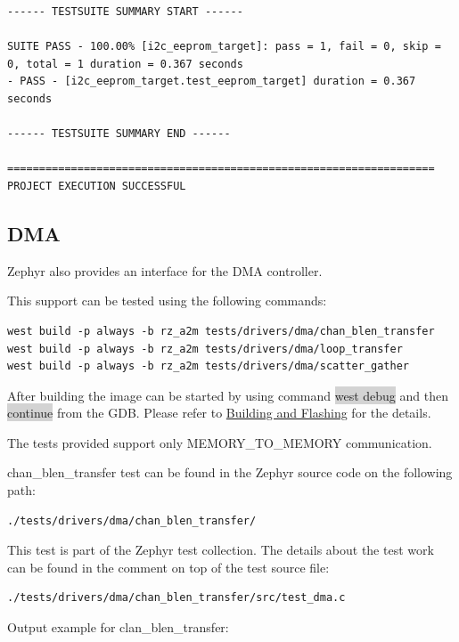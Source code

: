 \documentclass[11pt,a4paper,oneside]{article}
\begin{document}
\begin{lstlisting}
------ TESTSUITE SUMMARY START ------

SUITE PASS - 100.00% [i2c_eeprom_target]: pass = 1, fail = 0, skip = 0, total = 1 duration = 0.367 seconds
- PASS - [i2c_eeprom_target.test_eeprom_target] duration = 0.367 seconds

------ TESTSUITE SUMMARY END ------

===================================================================
PROJECT EXECUTION SUCCESSFUL
\end{lstlisting}

\subsection{DMA}\label{dma}

Zephyr also provides an interface for the DMA controller.

This support can be tested using the following commands:

\begin{lstlisting}
west build -p always -b rz_a2m tests/drivers/dma/chan_blen_transfer
west build -p always -b rz_a2m tests/drivers/dma/loop_transfer
west build -p always -b rz_a2m tests/drivers/dma/scatter_gather
\end{lstlisting}

After building the image can be started by using command \colorbox{lightgray}{west debug}
and then \colorbox{lightgray}{continue} from the GDB. Please refer to
\hyperref[building-and-flashing]{Building and Flashing} for the
details.

The tests provided support only MEMORY\_TO\_MEMORY communication.

chan\_blen\_transfer test can be found in the Zephyr source code on the
following path:

\begin{lstlisting}
./tests/drivers/dma/chan_blen_transfer/
\end{lstlisting}

This test is part of the Zephyr test collection. The details about the
test work can be found in the comment on top of the test source file:
\begin{lstlisting}
./tests/drivers/dma/chan_blen_transfer/src/test_dma.c
\end{lstlisting}

Output example for clan\_blen\_transfer:
\end{document}

